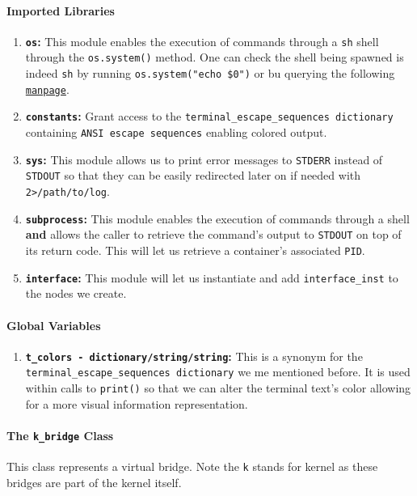     \paragraph{Imported Libraries}
        \begin{enumerate}
            \item \textbf{\texttt{os}:} This module enables the execution of commands through a \texttt{sh} shell through the \texttt{os.system()} method. One can check the shell being spawned is indeed \texttt{sh} by running \texttt{\allowbreak os.system("echo \$0")} or bu querying the following \href{https://linux.die.net/man/3/system}{\texttt{manpage}}.
            \item \textbf{\texttt{constants}:} Grant access to the \texttt{\allowbreak terminal\_escape\_sequences dictionary} containing \texttt{ANSI escape sequences} enabling colored output.
            \item \textbf{\texttt{sys}:} This module allows us to print error messages to \texttt{STDERR} instead of \texttt{STDOUT} so that they can be easily redirected later on if needed with \texttt{2>/path/to/log}.
            \item \textbf{\texttt{subprocess}:} This module enables the execution of commands through a shell \textbf{and} allows the caller to retrieve the command's output to \texttt{STDOUT} on top of its return code. This will let us retrieve a container's associated \texttt{PID}.
            \item \textbf{\texttt{interface}:} This module will let us instantiate and add \texttt{interface\_inst} to the nodes we create.
        \end{enumerate}

    \paragraph{Global Variables}
        \begin{enumerate}
            \item \textbf{\texttt{\allowbreak t\_colors - dictionary/string/string}:} This is a synonym for the \texttt{\allowbreak terminal\_escape\_sequences dictionary} we me mentioned before. It is used within calls to \texttt{print()} so that we can alter the terminal text's color allowing for a more visual information representation.
        \end{enumerate}

    \paragraph{The \texttt{k\_bridge} Class}
        This class represents a virtual bridge. Note the \texttt{k} stands for kernel as these bridges are part of the kernel itself.

